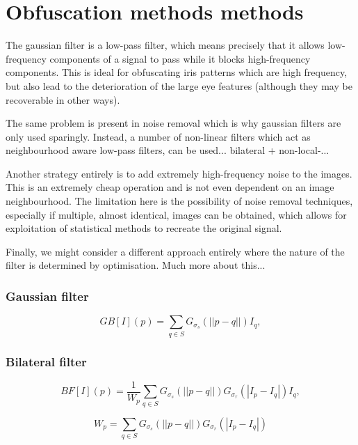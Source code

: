 \section{Obfuscation methods methods}

The gaussian filter is a low-pass filter, which means precisely that it allows low-frequency components of a signal to pass while it blocks high-frequency components. This is ideal for obfuscating iris patterns which are high frequency, but also lead to the deterioration of the large eye features (although they may be recoverable in other ways).

The same problem is present in noise removal which is why gaussian filters are only used sparingly. Instead, a number of non-linear filters which act as neighbourhood aware low-pass filters, can be used... bilateral + non-local-...

Another strategy entirely is to add extremely high-frequency noise to the images. This is an extremely cheap operation and is not even dependent on an image neighbourhood. The limitation here is the possibility of noise removal techniques, especially if multiple, almost identical, images can be obtained, which allows for exploitation of statistical methods to recreate the original signal.



Finally, we might consider a different approach entirely where the nature of the filter is determined by optimisation. Much more about this...

\subsubsection{Gaussian filter}
\begin{equation*}
    GB[I](p) = \sum_{q\in S} G_{\sigma_s}(||p-q||)I_q ,
\end{equation*}


\subsubsection{Bilateral filter}
\begin{equation*}
    BF[I](p) = \frac{1}{W_p}\sum_{q\in S} G_{\sigma_s}(||p-q||)G_{\sigma_r}(|I_p - I_q|)I_q ,
\end{equation*}

\begin{equation*}
    W_p = \sum_{q\in S} G_{\sigma_s}(||p-q||)G_{\sigma_r}(|I_p - I_q|) 
\end{equation*}

